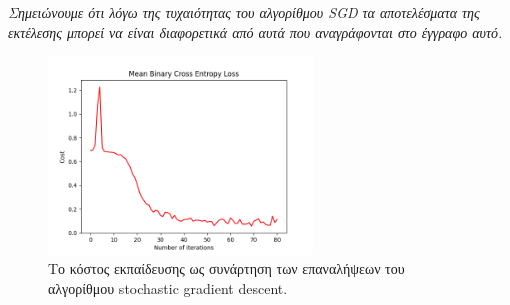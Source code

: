 \documentclass{article}
\begin{document}
\textit{Σημειώνουμε ότι λόγω της τυχαιότητας του αλγορίθμου SGD τα αποτελέσματα της εκτέλεσης μπορεί να είναι διαφορετικά από αυτά που αναγράφονται στο έγγραφο αυτό.}

\begin{figure}
	\includegraphics[width=7cm]{sgd_error.png}
	\centering
	\caption{Το κόστος εκπαίδευσης ως συνάρτηση των επαναλήψεων του αλγορίθμου stochastic gradient descent.}
	\label{sgd_train_test}
\end{figure}


\printbibliography
\end{document}
